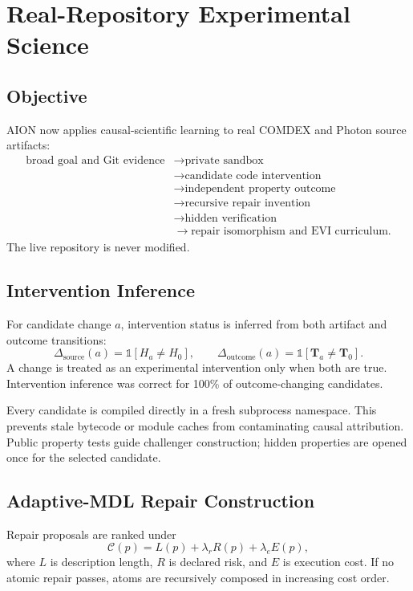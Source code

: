 \section{Real-Repository Experimental Science}
\label{sec:real-repository-experimental-science}

\subsection{Objective}

AION now applies causal-scientific learning to real COMDEX and Photon source
artifacts:
\[
\begin{aligned}
\text{broad goal and Git evidence}
&\rightarrow \text{private sandbox}\\
&\rightarrow \text{candidate code intervention}\\
&\rightarrow \text{independent property outcome}\\
&\rightarrow \text{recursive repair invention}\\
&\rightarrow \text{hidden verification}\\
&\rightarrow \text{repair isomorphism and EVI curriculum}.
\end{aligned}
\]
The live repository is never modified.

\subsection{Intervention Inference}

For candidate change \(a\), intervention status is inferred from both artifact
and outcome transitions:
\[
\Delta_{\mathrm{source}}(a)
=
\mathbb{1}[H_a\neq H_0],
\qquad
\Delta_{\mathrm{outcome}}(a)
=
\mathbb{1}[\mathbf{T}_a\neq\mathbf{T}_0].
\]
A change is treated as an experimental intervention only when both are true.
Intervention inference was correct for 100\% of outcome-changing candidates.

Every candidate is compiled directly in a fresh subprocess namespace. This
prevents stale bytecode or module caches from contaminating causal attribution.
Public property tests guide challenger construction; hidden properties are
opened once for the selected candidate.

\subsection{Adaptive-MDL Repair Construction}

Repair proposals are ranked under
\[
\mathcal{C}(p)
=
L(p)+\lambda_rR(p)+\lambda_eE(p),
\]
where \(L\) is description length, \(R\) is declared risk, and \(E\) is
execution cost. If no atomic repair passes, atoms are recursively composed in
increasing cost order.

